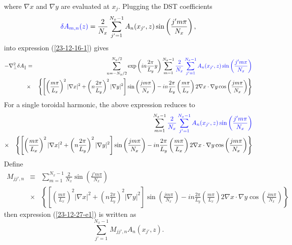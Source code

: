 \documentclass{article}
\newcommand{\tmcolor}[2]{{\color{#1}{#2}}}
\begin{document}
where $\nabla x$ and $\nabla y$ are evaluated at $x_j$. Plugging the DST
coefficients
\begin{equation}
  \tmcolor{blue}{\delta A_{m, n} (z)} = \frac{2}{N_x} \sum_{j' = 1}^{N_x - 1}
  A_n (x_{j'}, z) \sin \left( \frac{j' m \pi}{N_x} \right),
\end{equation}
into expression (\ref{23-12-16-1}) gives
\begin{eqnarray*}
  - \nabla_{\perp}^2 \delta A_{\parallel} & = & \sum_{n = - N_y / 2}^{N_y / 2}
  \exp \left( i n \frac{2 \pi}{L_y} y \right) \sum_{m = 1}^{N_x - 1}
  \tmcolor{blue}{\frac{2}{N_x} \sum_{j' = 1}^{N_x - 1} A_n (x_{j'}, z) \sin
  \left( \frac{j' m \pi}{N_x} \right)}\\
  & \times & \left\{ \left[ \left( \frac{m \pi}{L_x} \right)^2 | \nabla x|^2
  + \left( n \frac{2 \pi}{L_y} \right)^2 | \nabla y|^2 \right] \sin \left(
  \frac{j m \pi}{N_x} \right) - i n \frac{2 \pi}{L_y} \left( \frac{m \pi}{L_x}
  \right) 2 \nabla x \cdot \nabla y \cos \left( \frac{j m \pi}{N_x} \right)
  \right\}
\end{eqnarray*}
For a single toroidal harmonic, the above expression reduces to
\begin{eqnarray}
  &  & \sum_{m = 1}^{N_x - 1} \tmcolor{blue}{\frac{2}{N_x} \sum_{j' = 1}^{N_x
  - 1} A_n (x_{j'}, z) \sin \left( \frac{j' m \pi}{N_x} \right)} \nonumber\\
  & \times & \left\{ \left[ \left( \frac{m \pi}{L_x} \right)^2 | \nabla x|^2
  + \left( n \frac{2 \pi}{L_y} \right)^2 | \nabla y|^2 \right] \sin \left(
  \frac{j m \pi}{N_x} \right) - i n \frac{2 \pi}{L_y} \left( \frac{m \pi}{L_x}
  \right) 2 \nabla x \cdot \nabla y \cos \left( \frac{j m \pi}{N_x} \right)
  \right\}  \label{23-12-27-e1}
\end{eqnarray}
Define
\begin{eqnarray*}
  M_{j j', n} & \equiv & \sum_{m = 1}^{N_x - 1} \frac{2}{N_x} \sin \left(
  \frac{j' m \pi}{N_x} \right)\\
  & \times & \left\{ \left[ \left( \frac{m \pi}{L_x} \right)^2 | \nabla x|^2
  + \left( n \frac{2 \pi}{L_y} \right)^2 | \nabla y|^2 \right] \sin \left(
  \frac{j m \pi}{N_x} \right) - i n \frac{2 \pi}{L_y} \left( \frac{m \pi}{L_x}
  \right) 2 \nabla x \cdot \nabla y \cos \left( \frac{j m \pi}{N_x} \right)
  \right\}
\end{eqnarray*}
then expression (\ref{23-12-27-e1}) is written as
\begin{equation}
  \sum_{j' = 1}^{N_x - 1} M_{j j', n} A_n (x_{j'}, z) .
\end{equation}
\end{document}
